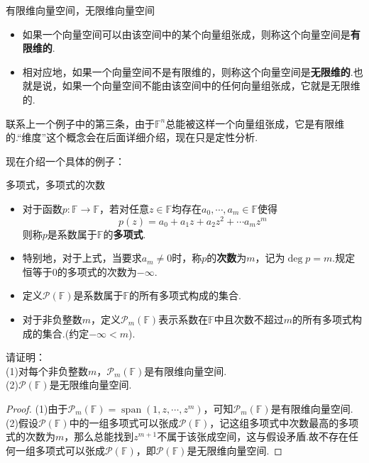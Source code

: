 \documentclass[lang=cn, zihao=5]{elegantbook}
\newcommand{\F}{\mathbb{F}}
\DeclareMathOperator{\spn}{span}
\begin{document}
\begin{definition}{有限维向量空间，无限维向量空间}
	\begin{itemize}
		\item 如果一个向量空间可以由该空间中的某个向量组张成，则称这个向量空间是\textbf{有限维的}.
		\item 相对应地，如果一个向量空间不是有限维的，则称这个向量空间是\textbf{无限维的}.也就是说，如果一个向量空间不能由该空间中的任何向量组张成，它就是无限维的.
	\end{itemize}
\end{definition}

联系上一个例子中的第三条，由于$\F ^{n}$总能被这样一个向量组张成，它是有限维的.“维度”这个概念会在后面详细介绍，现在只是定性分析.

现在介绍一个具体的例子：

\begin{definition}{多项式，多项式的次数}
	\begin{itemize}
		\item 对于函数$p:\F \to \F$，若对任意$z \in \F$均存在$a_0, \cdots ,a_m \in \F$使得$$p(z) = a_0 + a_1z + a_2z^2 + \cdots a_mz^m$$
		则称$p$是系数属于$\F$的\textbf{多项式}.
		\item 特别地，对于上式，当要求$a_m \neq 0$时，称$p$的\textbf{次数}为$m$，记为$\deg p = m$.规定恒等于$0$的多项式的次数为$-\infty$.
		\item 定义$\mathcal{P} (\F)$是系数属于$\F$的所有多项式构成的集合.
		\item 对于非负整数$m$，定义$\mathcal{P}_{m} (\F)$表示系数在$\F$中且次数不超过$m$的所有多项式构成的集合.(约定$-\infty < m$).
	\end{itemize}
\end{definition}

\begin{example}
	请证明： \\
	(1)对每个非负整数$m$，$\mathcal{P} _{m} (\F)$是有限维向量空间. \\
	(2)$\mathcal{P} (\F)$是无限维向量空间.
\end{example}
\begin{proof}
	(1)由于$\mathcal{P} _{m} (\F) = \spn (1,z, \cdots ,z^m)$，可知$\mathcal{P} _{m} (\F)$是有限维向量空间. \\
	(2)假设$\mathcal{P} (\F)$中的一组多项式可以张成$\mathcal{P} (\F)$，记这组多项式中次数最高的多项式的次数为$m$，那么总能找到$z^{m+1}$不属于该张成空间，这与假设矛盾.故不存在任何一组多项式可以张成$\mathcal{P} (\F)$，即$\mathcal{P} (\F)$是无限维向量空间.
\end{proof}
\end{document}
